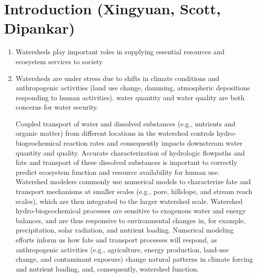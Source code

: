 \documentclass[preprint,review, 12pt]{elsarticle}
\begin{document}
\section{Introduction (Xingyuan, Scott, Dipankar)}
\begin{enumerate} 
\item Watersheds play important roles in supplying essential resources and ecosystem services to society
\item Watersheds are under stress due to shifts in climate conditions and anthropogenic activities (land use change, damming, atmospheric depositions responding to human activities). water quantity and water quality are both concerns for water security.

Coupled transport of water and dissolved substances (e.g., nutrients and organic matter) from different locations in the watershed controls hydro-biogeochemical reaction rates and consequently impacts downstream water quantity and quality. Accurate characterization of hydrologic flowpaths and fate and transport of these dissolved substances is important to correctly predict ecosystem function and resource availability for human use. Watershed modelers commonly use numerical models to characterize fate and transport mechanisms at smaller scales (e.g., pore, hillslope, and stream reach scales), which are then integrated to the larger watershed scale. Watershed hydro-biogeochemical processes are sensitive to exogenous water and energy balances, and are thus responsive to environmental changes in, for example, precipitation, solar radiation, and nutrient loading. Numerical modeling efforts inform us how fate and transport processes will respond, as anthropogenic activities (e.g., agriculture, energy production, land-use change, and contaminant exposure) change natural patterns in climate forcing and nutrient loading, and, consequently, watershed function. 


\end{enumerate}
\end{document}
